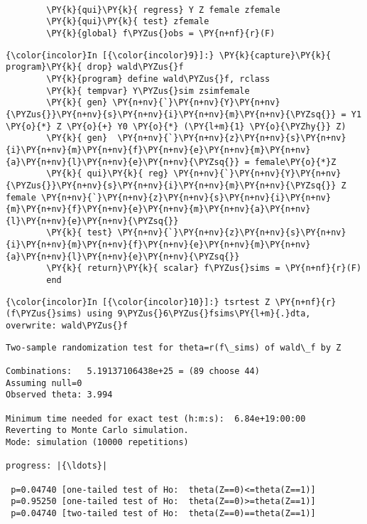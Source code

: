 \documentclass[11pt,notitlepage]{article}\usepackage[]{graphicx}\usepackage[]{color}
\makeatletter
\newenvironment{kframe}{%
 \def\at@end@of@kframe{}%
 \ifinner\ifhmode%
  \def\at@end@of@kframe{\end{minipage}}%
  \begin{minipage}{\columnwidth}%
 \fi\fi%
 \def\FrameCommand##1{\hskip\@totalleftmargin \hskip-\fboxsep
 \colorbox{shadecolor}{##1}\hskip-\fboxsep
     \hskip-\linewidth \hskip-\@totalleftmargin \hskip\columnwidth}%
 \MakeFramed {\advance\hsize-\width
   \@totalleftmargin\z@ \linewidth\hsize
   \@setminipage}}%
 {\par\unskip\endMakeFramed%
 \at@end@of@kframe}
\newenvironment{knitrout}{}{} %
\makeatother
\begin{document}
\begin{enumerate}[a)]
\begin{knitrout}
\begin{kframe}
\begin{Verbatim}[commandchars=\\\{\}]
        
        \PY{k}{qui}\PY{k}{ regress} Y Z female zfemale
        \PY{k}{qui}\PY{k}{ test} zfemale		
        \PY{k}{global} f\PYZus{}obs = \PY{n+nf}{r}(F)
\end{Verbatim}

    \begin{Verbatim}[commandchars=\\\{\}]
{\color{incolor}In [{\color{incolor}9}]:} \PY{k}{capture}\PY{k}{ program}\PY{k}{ drop} wald\PYZus{}f
        \PY{k}{program} define wald\PYZus{}f, rclass
        \PY{k}{	tempvar} Y\PYZus{}sim zsimfemale
        \PY{k}{	gen} \PY{n+nv}{`}\PY{n+nv}{Y}\PY{n+nv}{\PYZus{}}\PY{n+nv}{s}\PY{n+nv}{i}\PY{n+nv}{m}\PY{n+nv}{\PYZsq{}} = Y1 \PY{o}{*} Z \PY{o}{+} Y0 \PY{o}{*} (\PY{l+m}{1} \PY{o}{\PYZhy{}} Z)
        \PY{k}{	gen}  \PY{n+nv}{`}\PY{n+nv}{z}\PY{n+nv}{s}\PY{n+nv}{i}\PY{n+nv}{m}\PY{n+nv}{f}\PY{n+nv}{e}\PY{n+nv}{m}\PY{n+nv}{a}\PY{n+nv}{l}\PY{n+nv}{e}\PY{n+nv}{\PYZsq{}} = female\PY{o}{*}Z
        \PY{k}{	qui}\PY{k}{ reg} \PY{n+nv}{`}\PY{n+nv}{Y}\PY{n+nv}{\PYZus{}}\PY{n+nv}{s}\PY{n+nv}{i}\PY{n+nv}{m}\PY{n+nv}{\PYZsq{}} Z female \PY{n+nv}{`}\PY{n+nv}{z}\PY{n+nv}{s}\PY{n+nv}{i}\PY{n+nv}{m}\PY{n+nv}{f}\PY{n+nv}{e}\PY{n+nv}{m}\PY{n+nv}{a}\PY{n+nv}{l}\PY{n+nv}{e}\PY{n+nv}{\PYZsq{}}
        \PY{k}{	test} \PY{n+nv}{`}\PY{n+nv}{z}\PY{n+nv}{s}\PY{n+nv}{i}\PY{n+nv}{m}\PY{n+nv}{f}\PY{n+nv}{e}\PY{n+nv}{m}\PY{n+nv}{a}\PY{n+nv}{l}\PY{n+nv}{e}\PY{n+nv}{\PYZsq{}}
        \PY{k}{	return}\PY{k}{ scalar} f\PYZus{}sims = \PY{n+nf}{r}(F)
        end
\end{Verbatim}

    \begin{Verbatim}[commandchars=\\\{\}]
{\color{incolor}In [{\color{incolor}10}]:} tsrtest Z \PY{n+nf}{r}(f\PYZus{}sims) using 9\PYZus{}6\PYZus{}fsims\PY{l+m}{.}dta, overwrite: wald\PYZus{}f
\end{Verbatim}

    \begin{Verbatim}[commandchars=\\\{\}]
Two-sample randomization test for theta=r(f\_sims) of wald\_f by Z

Combinations:   5.19137106438e+25 = (89 choose 44)
Assuming null=0
Observed theta: 3.994

Minimum time needed for exact test (h:m:s):  6.84e+19:00:00
Reverting to Monte Carlo simulation.
Mode: simulation (10000 repetitions)

progress: |{\ldots}|

 p=0.04740 [one-tailed test of Ho:  theta(Z==0)<=theta(Z==1)]
 p=0.95250 [one-tailed test of Ho:  theta(Z==0)>=theta(Z==1)]
 p=0.04740 [two-tailed test of Ho:  theta(Z==0)==theta(Z==1)]


\end{Verbatim}
\end{kframe}
\end{knitrout}
\end{enumerate}
\end{document}
